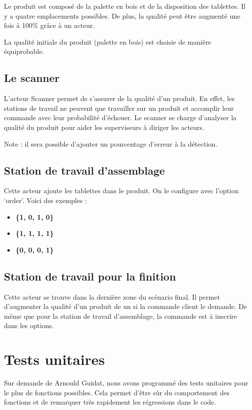 \documentclass[12pt,a4paper]{article}
\begin{document}
			 Le produit est composé de la palette en bois et de la disposition
			 des tablettes. Il y a quatre emplacements possibles. De plus,
			 la qualité peut être augmenté une fois à 100\% gr\^ace à un acteur.

			 La qualité initiale du produit (palette en bois) est choisie de
			 manière équiprobable.

		\subsection{Le scanner}
			L'acteur Scanner permet de s'assurer de la qualité d'un produit.
			En effet, les stations de travail ne peuvent que travailler sur un
			produit et accomplir leur commande avec leur probabilité d'échouer.
			Le scanner se charge d'analyser la qualité du produit pour aider
			les superviseurs à diriger les acteurs.

			Note : il sera possible d'ajouter un pourcentage d'erreur à la 
			détection.

		\subsection{Station de travail d'assemblage}
			Cette acteur ajoute les tablettes dans le produit. On le configure
			avec l'option `order'. Voici des exemples :

			\begin{itemize}
				\item \textbf{\{1, 0, 1, 0\}}
				\item \textbf{\{1, 1, 1, 1\}}
				\item \textbf{\{0, 0, 0, 1\}}
			\end{itemize}

		\subsection{Station de travail pour la finition}
			Cette acteur se trouve dans la dernière zone du scénario final. Il
			permet d'augmenter la qualité d'un produit de un si la commande
			client le demande. De même que pour la station de travail 
			d'assemblage, la commande est à inscrire dans les options.

	\section{Tests unitaires}
		Sur demande de Arnould Guidat, nous avons programmé des tests unitaires
		pour le plus de fonctions possibles. Cela permet d'être sûr du 
		comportement des fonctions et de remarquer très rapidement les 
		régressions dans le code.
\end{document}
